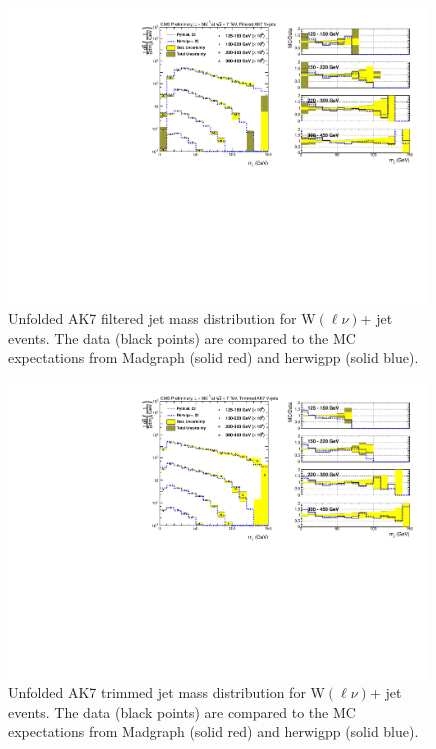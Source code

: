 \begin{figure}[!htb]
\includegraphics[width=0.99\textwidth]{figs/Wln/jetmassunf_ak7ft_log.pdf}
\caption{Unfolded AK7 filtered jet mass distribution for W$(\ell\nu)$+ jet events. The data (black points) are compared to the MC expectations from Madgraph (solid red) and herwigpp (solid blue).}
\label{figs:AK7WmnInt3}
\end{figure}

\begin{figure}[!htb]
\includegraphics[width=0.99\textwidth]{figs/Wln/jetmassunf_ak7tr_log.pdf}
\caption{Unfolded AK7 trimmed jet mass distribution for W$(\ell\nu)$+ jet events. The data (black points) are compared to the MC expectations from Madgraph (solid red) and herwigpp (solid blue).}
\label{figs:AK7WmnInt4}
\end{figure}



